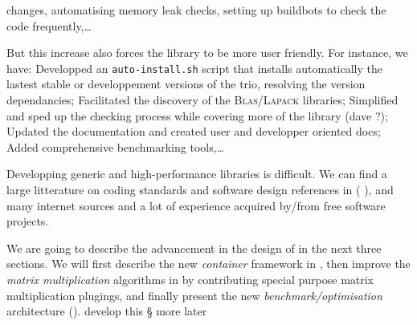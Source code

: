 changes, automatising memory leak checks, setting up buildbots to check the code
frequently,\dots
%
\par
%
But this increase also forces the library to be more user friendly. For
instance, we have:
%
Developped an \texttt{auto-install.sh} script that installs automatically the
lastest stable or developpement versions of the trio, resolving the version
dependancies;
%
Facilitated the discovery of the \textsc{Blas}/\textsc{Lapack} libraries;
%
Simplified and sped up the checking process while covering more of the library
(\danger dave ?);
%
Updated the documentation and created user and developper oriented docs;
%
Added comprehensive benchmarking tools,\dots
%
%
\par
%
Developping generic and high-performance libraries is difficult. We can find a
large litterature on coding standards and software design references in (\cf{}
\cite{alexandrescu:01:modern,gamma:95:design,sutter:05:cpp,stroustrup1994design,Douglas:05:GPHP}),
and many internet sources and a lot of experience acquired by/from free
software projects.
%
\par
%
We are going to describe the advancement in the design of \linbox in the next
three sections. We will first describe the new \emph{container} framework in
, then improve the \emph{matrix multiplication} algorithms
in  by contributing special purpose matrix multiplication
plugings, and finally present the new \emph{benchmark/optimisation}
architecture ().
%
\danger develop this § more later
